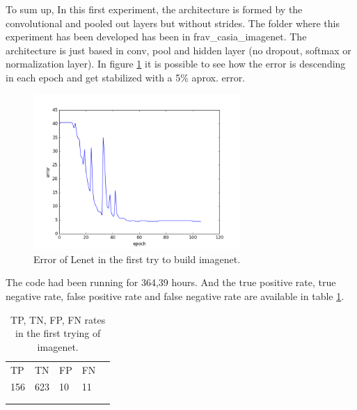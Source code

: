 To  sum up, In this first experiment, the architecture is formed by the convolutional and pooled out layers but without strides. The folder where this experiment has been developed has been in frav\_casia\_imagenet. The architecture is just based in conv, pool and hidden layer (no dropout, softmax or normalization layer). In figure \ref{fig:error_imagenet1} it is possible to see how the error is descending in each epoch and get stabilized with a 5\% aprox. error. \\
\begin{figure}[htb]
\centering
\includegraphics[width=0.7\textwidth]{images/imagenet/error_frav-Imagenet1.png}
\caption{Error of Lenet in the first try to build imagenet.} \label{fig:error_imagenet1}
\end{figure}

The code had been running for 364,39 hours. And the true positive rate, true negative rate, false positive rate and false negative rate are available in table \ref{tabla_error_imagenet1}. \\

\begin{table}[htb]
\centering
\label{tabla_error_imagenet1}
\begin{tabular}{lllll}
\cline{1-4}
\multicolumn{1}{|l}{TP} & \multicolumn{1}{l}{TN} & \multicolumn{1}{l}{FP} & \multicolumn{1}{l|}{FN} &  \\ \cline{1-4}
\multicolumn{1}{|l}{156} & \multicolumn{1}{l}{623} & \multicolumn{1}{l}{10} & \multicolumn{1}{l|}{11} &  \\ \cline{1-4}
                         &                         &                         &                         &  \\
                         &                         &                         &                         &
\end{tabular}
\caption{TP, TN, FP, FN rates in the first trying of imagenet.}

\end{table}



